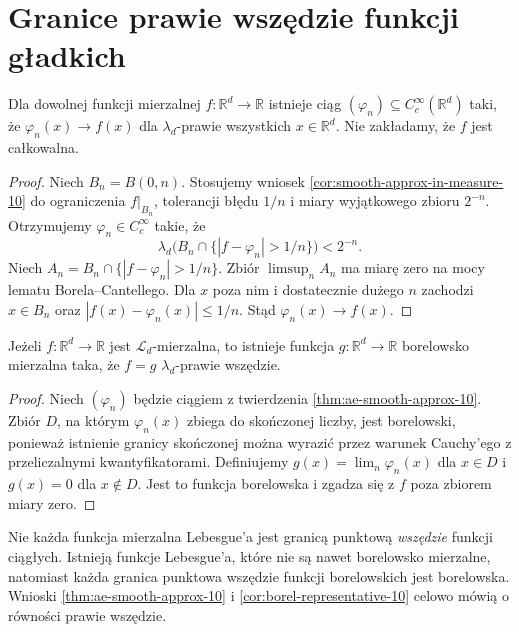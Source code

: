 \section{Granice prawie wszędzie funkcji gładkich}

\begin{twierdzenie}
\label{thm:ae-smooth-approx-10}
Dla dowolnej funkcji mierzalnej
$f:\mathbb R^d\to\mathbb R$ istnieje ciąg
$(\varphi_n)\subseteq C_c^\infty(\mathbb R^d)$
taki, że $\varphi_n(x)\to f(x)$ dla
$\lambda_d$-prawie wszystkich $x\in\mathbb R^d$.
Nie zakładamy, że $f$ jest całkowalna.
\end{twierdzenie}
\begin{proof}
Niech $B_n=B(0,n)$. Stosujemy wniosek
\ref{cor:smooth-approx-in-measure-10} do ograniczenia
$f|_{B_n}$, tolerancji błędu $1/n$ i miary
wyjątkowego zbioru $2^{-n}$. Otrzymujemy
$\varphi_n\in C_c^\infty$ takie, że
\[
\lambda_d\bigl(B_n\cap
\{|f-\varphi_n|>1/n\}\bigr)<2^{-n}.
\]
Niech $A_n=B_n\cap\{|f-\varphi_n|>1/n\}$.
Zbiór $\limsup_n A_n$ ma miarę zero na mocy
lematu Borela--Cantellego. Dla $x$ poza nim
i dostatecznie dużego $n$ zachodzi $x\in B_n$
oraz $|f(x)-\varphi_n(x)|\le1/n$.
Stąd $\varphi_n(x)\to f(x)$.
\end{proof}

\begin{wniosek}
\label{cor:borel-representative-10}
Jeżeli $f:\mathbb R^d\to\mathbb R$ jest
$\mathcal L_d$-mierzalna, to istnieje funkcja
$g:\mathbb R^d\to\mathbb R$ borelowsko mierzalna
taka, że $f=g$ $\lambda_d$-prawie wszędzie.
\end{wniosek}
\begin{proof}
Niech $(\varphi_n)$ będzie ciągiem z twierdzenia
\ref{thm:ae-smooth-approx-10}.
Zbiór $D$, na którym $\varphi_n(x)$ zbiega
do skończonej liczby, jest borelowski, ponieważ
istnienie granicy skończonej można wyrazić przez
warunek Cauchy'ego z przeliczalnymi kwantyfikatorami.
Definiujemy $g(x)=\lim_n\varphi_n(x)$ dla $x\in D$
i $g(x)=0$ dla $x\notin D$.
Jest to funkcja borelowska i zgadza się z $f$
poza zbiorem miary zero.
\end{proof}

\begin{uwaga}
Nie każda funkcja mierzalna Lebesgue'a jest granicą
punktową \emph{wszędzie} funkcji ciągłych.
Istnieją funkcje Lebesgue'a, które nie są nawet
borelowsko mierzalne, natomiast każda granica
punktowa wszędzie funkcji borelowskich jest
borelowska. Wnioski
\ref{thm:ae-smooth-approx-10} i
\ref{cor:borel-representative-10} celowo mówią
o równości prawie wszędzie.
\end{uwaga}



